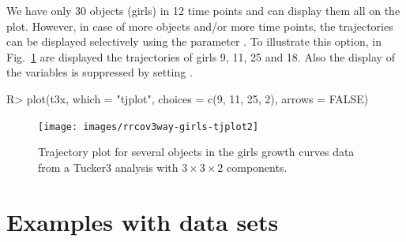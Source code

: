 \documentclass[article,shortnames, nojss]{jss}
\begin{document}
We have only 30 objects (girls) in 12 time points and can display them
all on the plot. However, in case of more objects and/or more time points,
the trajectories can be displayed selectively using the parameter .
To illustrate this option, in Fig.~\ref{fig-girls-tjplot2} are displayed
the trajectories of girls 9, 11, 25 and 18. Also the display of the variables
is suppressed by setting .
\begin{Schunk}
\begin{Sinput}
R> plot(t3x, which = "tjplot", choices = c(9, 11, 25, 2), arrows = FALSE)
\end{Sinput}
\end{Schunk}
\begin{figure}[H]
\centering
\texttt{[image: images/rrcov3way-girls-tjplot2]}
\caption{Trajectory plot for several objects in the girls growth curves data from a Tucker3
analysis with $3\times3\times2$ components. }
\label{fig-girls-tjplot2}
\end{figure}

\section{Examples with data sets}
\label{sec:examples}
\end{document}

